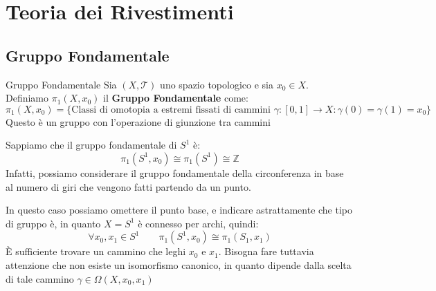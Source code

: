 \documentclass[11pt, a4paper, twoside]{article}
\begin{document}

\tableofcontents

\newpage

\section{Teoria dei Rivestimenti}

\subsection{Gruppo Fondamentale}

\begin{defn}{Gruppo Fondamentale}{}
	Sia $(X, \mathcal T)$ uno spazio topologico e sia $x_0 \in X$. Definiamo $\pi_1(X,x_0)$ il \textbf{Gruppo Fondamentale} come:
	\[ \pi_1(X,x_0)=\{ \text{Classi di omotopia a estremi fissati di cammini }\gamma:[0,1] \to X : \gamma(0) = \gamma(1) = x_0 \} \]
	Questo è un gruppo con l'operazione di giunzione tra cammini
\end{defn}

\begin{es}[$S^1$]
	Sappiamo che il gruppo fondamentale di $S^1$ è:
	\[ \pi_1(S^1,x_0) \cong \pi_1(S^1) \cong \mathbb Z \]
	Infatti, possiamo considerare il gruppo fondamentale della circonferenza in base al numero di giri che vengono fatti partendo da un punto.
	\begin{center}
	\end{center}
\end{es}

In questo caso possiamo omettere il punto base, e indicare astrattamente che tipo di gruppo è, in quanto $X = S^1$ è connesso per archi, quindi:
\[ \forall x_0,x_1 \in S^1 \qquad \pi_1(S^1, x_0) \cong \pi_1(S_1, x_1) \]
È sufficiente trovare un cammino che leghi $x_0$ e $x_1$. Bisogna fare tuttavia attenzione che non esiste un isomorfismo canonico, in quanto dipende dalla scelta di tale cammino $\gamma \in \Omega(X, x_0,x_1)$
\begin{center}
\end{center}
\end{document}
